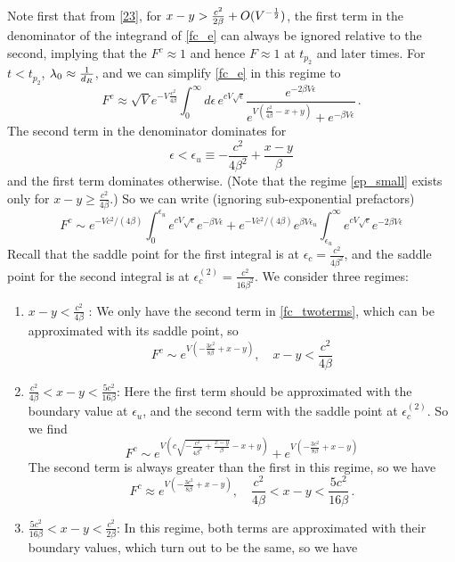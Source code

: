 \documentclass[a4paper,11pt]{article}
\newcommand\half{{\ensuremath{\frac{1}{2}}}}
\newcommand{\be}{\begin{equation}}
\newcommand{\ee}{\end{equation}}
\def\b{{\beta}}
\newcommand\lam{\lambda}
\newcommand\ov{\over}
\newcommand\ha{{\half}}
\begin{document}
\begin{enumerate}
\begin{appendix}
Note first that from \eqref{23}, for $x-y > {c^2 \ov 2 \b} + O(V^{-\ha})$, the first term in the denominator of the integrand of \eqref{fc_e} can always be ignored relative to the second, implying that the $F^c\approx 1$ and hence $F\approx 1$ at $t_{p_2}$ and later times.
For $t< t_{p_2}$, $\lam_0 \approx {1 \ov d_R}$, and we can simplify \eqref{fc_e} in this regime to 
\be 
F^c \approx \sqrt{V} e^{-V \frac{c^2}{4\beta}} \int_0^{\infty} d\epsilon \, e^{c V \sqrt{\epsilon}} \frac{e^{-2\beta V \epsilon}}{e^{V(\frac{c^2}{4\beta}-x +y)}+ e^{-\beta V \epsilon}} \, . 
\label{115}
\ee
The second term in the denominator dominates for 
\be
\epsilon < \epsilon_u \equiv -\frac{c^2}{4\beta^2} + \frac{x-y}{\beta} \label{ep_small}
\ee
and the first term dominates otherwise. (Note that the regime \eqref{ep_small} exists only for $x-y \geq \frac{c^2}{4\beta}$.) So we can write (ignoring sub-exponential prefactors)
\be 
F^c \sim e^{-V c^2/(4\beta)} \int_0^{\epsilon_u} e^{c V \sqrt{\epsilon}} e^{- \beta V \epsilon} + e^{-V c^2/(4\beta)} e^{\beta V \epsilon_u} \int_{\epsilon_u}^{\infty} e^{c V \sqrt{\epsilon}} e^{-2 \beta V \epsilon}
\label{fc_twoterms} 
\ee
Recall that the saddle point for the first integral is at $\epsilon_c = \frac{c^2}{4\beta^2}$, and the saddle point for the second integral is at $\epsilon^{(2)}_c =\frac{c^2}{16\beta^2}$. 
We consider three regimes: 
\begin{enumerate} 
\item $x -y < \frac{c^2}{4\beta}$ : We only have the second term in \eqref{fc_twoterms}, which can be approximated with its saddle point, so 
\be 
F^c \sim e^{V(-\frac{3c^2}{8\beta} + x-y)} , \quad x -y < \frac{c^2}{4\beta} \label{29}
\ee
\item $ \frac{c^2}{4\beta} < x - y < \frac{5c^2}{16\beta}$: Here the first term should be approximated with the boundary value at $\epsilon_u$, and the second term with the saddle point at $\epsilon^{(2)}_c$. So we find 
\be 
F^c \sim e^{V (c \sqrt{-\frac{c^2}{4\beta^2} + \frac{x-y}{\beta}} -x+y )} + e^{V(-\frac{3c^2}{8\beta} + x-y)}
\ee
The second term is always greater than the first in this regime, so we have 
\be 
F^c \approx e^{V(-\frac{3c^2}{8\beta} + x-y)} , \quad \frac{c^2}{4\beta} < x-y< \frac{5c^2}{16\beta} \, . 
\ee
\item $ \frac{5c^2}{16\beta} < x - y < \frac{c^2}{2\beta}$: In this regime, both terms are approximated with their boundary values, which turn out to be the same, so we have 

\end{enumerate}
\end{appendix}
\end{enumerate}
\end{document}
